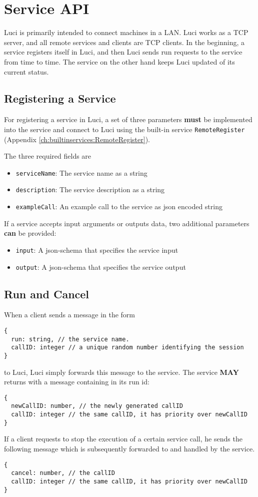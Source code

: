 \section{Service API}
\label{ch:serviceapi}

Luci is primarily intended to connect machines in a LAN. Luci works as a TCP server, and all remote services and clients are TCP clients. In the beginning, a service registers itself in Luci, and then Luci sends run requests to the service from time to time. The service on the other hand keeps Luci updated of its current status.

\subsection{Registering a Service}

For registering a service in Luci, a set of three parameters \textbf{must} be implemented into the service and connect to Luci using the built-in service \texttt{RemoteRegister} (Appendix \ref{ch:builtinservices:RemoteRegister}).

The three required fields are
\begin{itemize}
  \item \texttt{serviceName}: The service name as a string
  \item \texttt{description}: The service description as a string
  \item \texttt{exampleCall}: An example call to the service as json encoded string
\end{itemize}

If a service accepts input arguments or outputs data, two additional parameters \textbf{can} be provided:
\begin{itemize}
  \item \texttt{input}: A json-schema that specifies the service input
  \item \texttt{output}: A json-schema that specifies the service output
\end{itemize}

\subsection{Run and Cancel}
When a client sends a message in the form
\begin{lstlisting}
{
  run: string, // the service name.
  callID: integer // a unique random number identifying the session
}
\end{lstlisting}
to Luci, Luci simply forwards this message to the service. The service \textbf{MAY} returns with a message containing in its run id:
\begin{lstlisting}
{
  newCallID: number, // the newly generated callID
  callID: integer // the same callID, it has priority over newCallID
}
\end{lstlisting}
If a client requests to stop the execution of a certain service call, he sends the following message which is subsequently forwarded to and handled by the service.
\begin{lstlisting}
{
  cancel: number, // the callID
  callID: integer // the same callID, it has priority over newCallID
}
\end{lstlisting}


